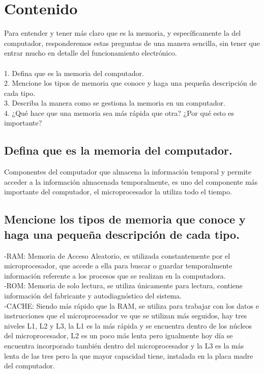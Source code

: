 \documentclass{article}
\begin{document}
\section{Contenido}\label{contenido}
Para entender y tener más claro que es la memoria, y específicamente la del computador, responderemos estas preguntas de una manera sencilla, sin tener que entrar mucho en detalle del funcionamiento electrónico.\\\\
1. Defina que es la memoria del computador.\\
2. Mencione los tipos de memoria que conoce y haga una pequeña descripción de cada tipo.\\
3. Describa la manera como se gestiona la memoria en un computador.\\
4. ¿Qué hace que una memoria sea más rápida que otra? ¿Por qué esto es importante?\\
\newpage

\subsection{Defina que es la memoria del computador.}

Componentes del computador que almacena la información temporal y permite acceder a la información almacenada temporalmente, es uno del componente más importante del computador, el microprocesador la utiliza todo el tiempo.\cite{Augusto}

\subsection{Mencione los tipos de memoria que conoce y haga una pequeña descripción de cada tipo.}

-RAM: Memoria de Acceso Aleatorio, es utilizada constantemente por el microprocesador, que accede a ella para buscar o guardar temporalmente información referente a los procesos que se realizan en la computadora. \cite{Venturini} \\

-ROM: Memoria de solo lectura, se utiliza únicamente para lectura, contiene información del fabricante y autodiagnóstico del sistema. \cite{wiki} \\


-CACHE: Siendo más rápido que la RAM, se utiliza para trabajar con los datos e instrucciones que el microprocesador ve que se utilizan más seguidos, hay tres niveles L1, L2 y L3, la L1 es la más rápida y se encuentra dentro de los núcleos del microprocesador, L2 es un poco más lenta pero igualmente hoy día se encuentra incorporado también dentro del microprocesador y  la L3 es la más lenta de las tres pero la que mayor capacidad tiene, instalada en la placa madre del computador.\cite{Augusto} \\
\end{document}
